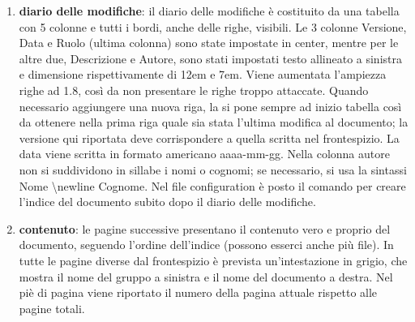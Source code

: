 \begin{enumerate}
    \item \textbf{diario delle modifiche}:
            il diario delle modifiche è costituito da una tabella con 5 colonne e tutti i 
            bordi, anche delle righe, visibili. Le 3 colonne Versione, Data e Ruolo (ultima colonna) 
            sono state impostate in center, mentre per le altre due, Descrizione e Autore, sono stati impostati 
            testo allineato a sinistra e dimensione rispettivamente di 12em e 7em.
            Viene aumentata l'ampiezza righe ad 1.8, così da non presentare le righe troppo attaccate. \newline
            Quando necessario aggiungere una nuova riga, la si pone sempre ad inizio tabella così da ottenere 
            nella prima riga quale sia stata l'ultima modifica al documento; la versione qui riportata 
            deve corrispondere a quella scritta nel frontespizio. \newline
            La data viene scritta in formato americano aaaa-mm-gg. \newline
            Nella colonna autore non si suddividono in sillabe i nomi o cognomi; se necessario, si usa la 
            sintassi Nome \textbackslash newline Cognome. \newline
            Nel file configuration è posto il comando per creare l'indice del documento subito 
            dopo il diario delle modifiche.

    \item \textbf{contenuto}: 
            le pagine successive presentano il contenuto vero e proprio del documento, seguendo l'ordine
            dell'indice (possono esserci anche più file). In tutte le pagine diverse dal frontespizio è 
            prevista un'intestazione in grigio, che mostra il nome del gruppo a sinistra e il nome del 
            documento a destra.
            Nel piè di pagina viene riportato il numero della pagina attuale rispetto alle pagine totali.
\end{enumerate}

